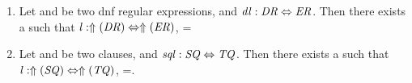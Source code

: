 \documentclass[numbers]{sigplanconf}
\begin{document}
\begin{lemma}\leavevmode
  \label{lem:dnfcal}
  \begin{enumerate}
  \item Let \DNFRegex{} and \DNFRegexAlt{} be two dnf regular expressions, and $\mathit{dl} : \mathit{DR} \Leftrightarrow \mathit{ER}$.  Then there exists a \Lens{} such that $\mathit{l} : \Uparrow(\mathit{DR}) \Leftrightarrow \Uparrow(\mathit{ER})$, \SemanticsOf{\Lens}=\SemanticsOf{\DNFLens}

  \item Let \Sequence{} and \SequenceAlt{} be two clauses, and $\mathit{sql} : \mathit{SQ} \Leftrightarrow \mathit{TQ}$.  Then there exists a \Lens{} such that $\mathit{l} : \Uparrow(\mathit{SQ}) \Leftrightarrow \Uparrow(\mathit{TQ})$, \SemanticsOf{\Lens}=\SemanticsOf{\SequenceLens}.


\end{enumerate}
\end{lemma}
\end{document}
